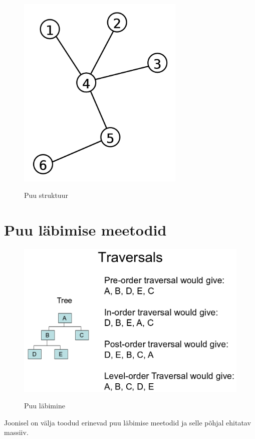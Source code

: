 \documentclass{trkut}
\theoremstyle{definition}
\begin{document}
\begin{appendices}
    \begin{figure}[H]%
    \includegraphics[width=8cm]{puu.png}%
    \caption{Puu struktuur}%
    \label{puu}%
    \end{figure}

\chapter{Puu läbimise meetodid}\label{lisa3}
    \tiny
    \normalsize
    \begin{figure}[H]%
    \includegraphics[width=14cm]{traversal.png}%
    \caption{Puu läbimine}%
    \label{pragmas}%
    \end{figure}
    Joonisel on välja toodud erinevad puu läbimise meetodid ja selle põhjal ehitatav massiiv\parencite{cohen}.


\end{appendices}
\end{document}
